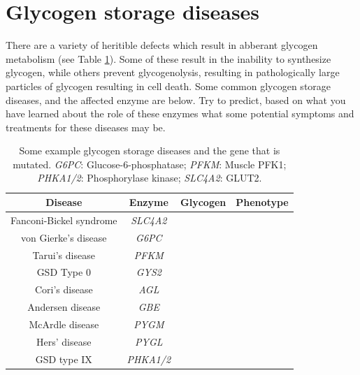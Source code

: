 \documentclass{tufte-handout}
\begin{document}
\section{Glycogen storage diseases}

There are a variety of heritible defects which result in abberant glycogen metabolism (see Table \ref{tab:glycogen-storage-diseases}).  Some of these result in the inability to synthesize glycogen, while others prevent glycogenolysis, resulting in pathologically large particles of glycogen resulting in cell death.  Some common glycogen storage diseases, and the affected enzyme are below.   Try to predict, based on what you have learned about the role of these enzymes what some potential symptoms and treatments for these diseases may be.

\begin{table}
\centering
\caption{Some example glycogen storage diseases and the gene that is mutated.  \textit{G6PC}: Glucose-6-phosphatase; \textit{PFKM}: Muscle PFK1; \textit{PHKA1/2}: Phosphorylase kinase; \textit{SLC4A2}: GLUT2.}
\label{tab:glycogen-storage-diseases}
\begin{tabular}{cccc}
\hline
\textbf {Disease} & \textbf{Enzyme} & Glycogen &  Phenotype \\
\hline
Fanconi-Bickel syndrome & \textit{SLC4A2} & &  \\
von Gierke's disease & \textit{G6PC} & & \\
Tarui's disease & \textit{PFKM} & & \\
GSD Type 0 & \textit{GYS2} & & \\
Cori's disease & \textit{AGL} &  &\\
Andersen disease & \textit{GBE} & & \\
McArdle disease& \textit{PYGM} & & \\
Hers' disease & \textit{PYGL} & & \\
GSD type IX & \textit{PHKA1/2} & & \\
\hline
\end{tabular}
\end{table}




\end{document}
